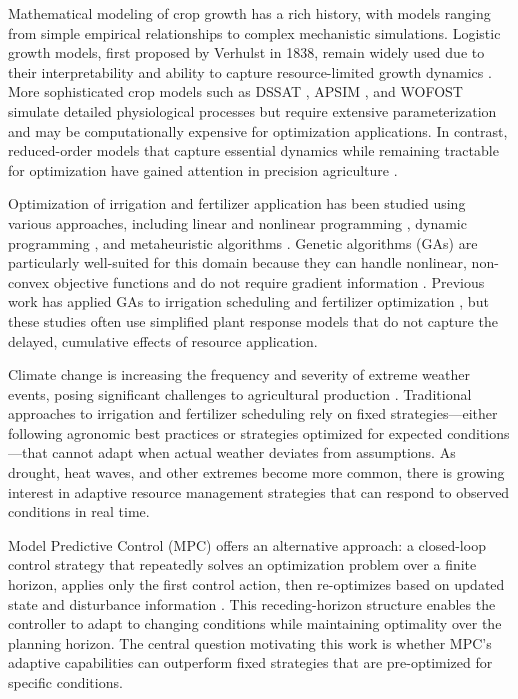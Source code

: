 \documentclass[preprint,12pt]{elsarticle}
\begin{document}
Mathematical modeling of crop growth has a rich history, with models ranging from simple empirical relationships to complex mechanistic simulations. Logistic growth models, first proposed by Verhulst in 1838, remain widely used due to their interpretability and ability to capture resource-limited growth dynamics \cite{verhulst1838}. More sophisticated crop models such as DSSAT \cite{jones2003dssat}, APSIM \cite{holzworth2014apsim}, and WOFOST \cite{wofost} simulate detailed physiological processes but require extensive parameterization and may be computationally expensive for optimization applications. In contrast, reduced-order models that capture essential dynamics while remaining tractable for optimization have gained attention in precision agriculture \cite{precision-ag-review}.

Optimization of irrigation and fertilizer application has been studied using various approaches, including linear and nonlinear programming \cite{irrigation-optimization}, dynamic programming \cite{dp-irrigation}, and metaheuristic algorithms \cite{ga-agriculture}. Genetic algorithms (GAs) are particularly well-suited for this domain because they can handle nonlinear, non-convex objective functions and do not require gradient information \cite{goldberg1989ga}. Previous work has applied GAs to irrigation scheduling \cite{ga-irrigation-scheduling} and fertilizer optimization \cite{ga-fertilizer}, but these studies often use simplified plant response models that do not capture the delayed, cumulative effects of resource application.

Climate change is increasing the frequency and severity of extreme weather events, posing significant challenges to agricultural production \cite{ipcc2021}. Traditional approaches to irrigation and fertilizer scheduling rely on fixed strategies---either following agronomic best practices or strategies optimized for expected conditions---that cannot adapt when actual weather deviates from assumptions. As drought, heat waves, and other extremes become more common, there is growing interest in adaptive resource management strategies that can respond to observed conditions in real time.

Model Predictive Control (MPC) offers an alternative approach: a closed-loop control strategy that repeatedly solves an optimization problem over a finite horizon, applies only the first control action, then re-optimizes based on updated state and disturbance information \cite{rawlings2017mpc}. This receding-horizon structure enables the controller to adapt to changing conditions while maintaining optimality over the planning horizon. The central question motivating this work is whether MPC's adaptive capabilities can outperform fixed strategies that are pre-optimized for specific conditions.
\end{document}
